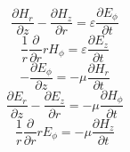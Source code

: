 \begin{equation}\label{eq:reln8}
	\frac{\partial H_r}{\partial z} - \frac{\partial H_z}{\partial r} = \varepsilon \frac{\partial E_\phi}{\partial t}
\end{equation}
\begin{equation}\label{eq:reln9}
	\frac{1}{r} \frac{\partial}{\partial r} r H_\phi = \varepsilon \frac{\partial E_z}{\partial t}
\end{equation}
\begin{equation}\label{eq:reln10}
	- \frac{\partial E_\phi}{\partial z} = -\mu \frac{\partial H_r}{\partial t}
\end{equation}
\begin{equation}\label{eq:reln11}
	\frac{\partial E_r}{\partial z} - \frac{\partial E_z}{\partial r} = -\mu \frac{\partial H_\phi}{\partial t}
\end{equation}
\begin{equation}\label{eq:reln12}
	\frac{1}{r} \frac{\partial}{\partial r} r E_\phi = -\mu \frac{\partial H_z}{\partial t}
\end{equation}

